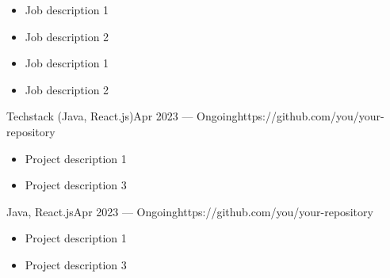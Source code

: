 \documentclass[10pt,a4paper,ragged2e,withhyper]{nextcv}
\begin{document}
\begin{paracol}{2}

\begin{itemize}
\item Job description 1
\item Job description 2
\end{itemize}

\divider%

\begin{itemize}
\item Job description 1
\item Job description 2
\end{itemize}

\medskip



{Techstack (Java, React.js)}{Apr 2023 --- Ongoing}{https://github.com/you/your-repository}
\begin{itemize}
  \item Project description 1
  \item Project description 3
\end{itemize}

\divider%

{Java, React.js}{Apr 2023 --- Ongoing}{https://github.com/you/your-repository}
\begin{itemize}
  \item Project description 1
  \item Project description 3
\end{itemize}

\medskip




\medskip



\newpage




\end{paracol}
\end{document}
